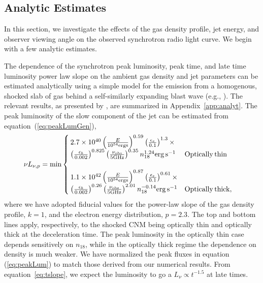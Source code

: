 \documentclass[usenatbib,fleqn]{mnras}
\begin{document}
\subsection{Analytic Estimates}
\label{sec:analyt}
In this section, we investigate the effects of the gas density
profile, jet energy, and observer viewing angle on the observed
synchrotron radio light curve.  We begin with a few analytic
estimates.

The dependence of the synchrotron peak luminosity, peak time, and late
time luminosity power law slope on the ambient gas density and jet
parameters can be estimated analytically using a simple model for the
emission from a homogenous, shocked slab of gas behind a
self-similarly expanding blast wave (e.g., \citealt{Sari+98,
  Granot+02}).  The relevant results, as presented by
\citet{Leventis+2012}, are summarized in Appendix~\ref{app:analyt}.
The peak luminosity of the slow component of the jet can be estimated
from equation~(\ref{eq:peakLumGen}),
\begin{align}
\nu L_{\nu, p}&=\text{min}
\begin{cases}
  2.7\times 10^{40} \left(\frac{E}{10^{54} {\rm ergs}}\right)^{0.59}
  \left(\frac{\epsilon_e}{0.1}\right)^{1.3}\times \\
  \left(\frac{\epsilon_b}{0.002}\right)^{0.825}\left(\frac{\nu_{\rm
        obs}}{5 {\rm GHz}}\right)^{0.35} n_{18}^{1.24}
  {\rm erg \, s^{-1}} & {\rm Optically\, thin}\\\\
  1.1 \times 10^{42} \left(\frac{E}{10^{54} {\rm ergs}}\right)^{0.87}
  \left(\frac{\epsilon_e}{0.1}\right)^{0.61}\times\\
  \left(\frac{\epsilon_b}{0.002}\right)^{0.26}\left(\frac{\nu_{\rm
        obs}}{5 {\rm GHz}}\right)^{2.01} n_{18}^{-0.14} {\rm erg\,
    s^{-1}} & {\rm Optically\, thick},
\end{cases}
\label{eq:peakLum}
\end{align}
where we have adopted fiducial values for the power-law slope of the
gas density profile, $k=1$, and the electron energy distribution,
$p=2.3$.  The top and bottom lines apply, respectively, to the shocked
CNM being optically thin and optically thick at the deceleration time.
The peak luminosity in the optically thin case depends sensitively on
$n_{18}$, while in the optically thick regime the dependence on
density is much weaker.  We have normalized the peak fluxes in
equation (\ref{eq:peakLum}) to match those derived from our numerical
results. From equation~\eqref{eq:tslope}, we expect the luminosity to
go a $L_\nu \propto t^{-1.5}$ at late times.
\end{document}
